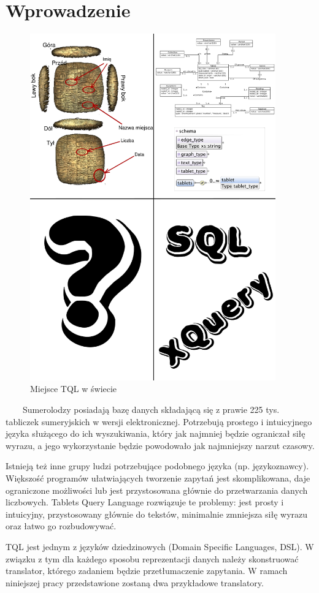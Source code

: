 \chapter*{Wprowadzenie}
\begin{figure}
 \centering
\includegraphics[width=400px]{./diagramy/poco.pdf}
 \caption{Miejsce TQL w świecie}
\end{figure}


\ \ \ \ Sumerolodzy posiadają bazę danych składającą się z prawie 225 tys. tabliczek sumeryjskich w wersji elektronicznej. 
Potrzebują prostego i intuicyjnego języka służącego do ich wyszukiwania, który jak najmniej będzie ograniczał siłę wyrazu,
 a jego wykorzystanie będzie powodowało jak najmniejszy narzut czasowy.

Istnieją też inne grupy ludzi potrzebujące podobnego języka (np. językoznawcy). 
Większość programów ułatwiających tworzenie zapytań jest skomplikowana, daje ograniczone możliwości lub jest przystosowana głównie do przetwarzania danych liczbowych. Tablets Query Language rozwiązuje te problemy: jest prosty i intuicyjny, przystosowany głównie do tekstów, minimalnie zmniejsza siłę wyrazu oraz łatwo go rozbudowywać. 

TQL jest jednym z języków dziedzinowych (Domain Specific Languages, DSL). 
W związku z tym dla każdego sposobu reprezentacji danych należy skonstruować translator, 
którego zadaniem będzie przetłumaczenie zapytania. 
W ramach niniejszej pracy przedstawione zostaną dwa przykładowe translatory.
